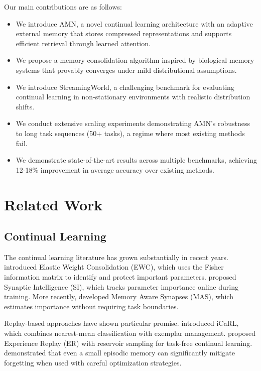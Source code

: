 \documentclass[11pt]{article}
\begin{document}
Our main contributions are as follows:
\begin{itemize}
    \item We introduce AMN, a novel continual learning architecture with an adaptive external memory that stores compressed representations and supports efficient retrieval through learned attention.
    \item We propose a memory consolidation algorithm inspired by biological memory systems that provably converges under mild distributional assumptions.
    \item We introduce StreamingWorld, a challenging benchmark for evaluating continual learning in non-stationary environments with realistic distribution shifts.
    \item We conduct extensive scaling experiments demonstrating AMN's robustness to long task sequences (50+ tasks), a regime where most existing methods fail.
    \item We demonstrate state-of-the-art results across multiple benchmarks, achieving 12-18\% improvement in average accuracy over existing methods.
\end{itemize}

\section{Related Work}
\label{sec:related}

\subsection{Continual Learning}

The continual learning literature has grown substantially in recent years. \citet{kirkpatrick2017overcoming} introduced Elastic Weight Consolidation (EWC), which uses the Fisher information matrix to identify and protect important parameters. \citet{zenke2017continual} proposed Synaptic Intelligence (SI), which tracks parameter importance online during training. More recently, \citet{aljundi2018memory} developed Memory Aware Synapses (MAS), which estimates importance without requiring task boundaries.

Replay-based approaches have shown particular promise. \citet{rebuffi2017icarl} introduced iCaRL, which combines nearest-mean classification with exemplar management. \citet{rolnick2019experience} proposed Experience Replay (ER) with reservoir sampling for task-free continual learning. \citet{chaudhry2019tiny} demonstrated that even a small episodic memory can significantly mitigate forgetting when used with careful optimization strategies.
\end{document}
